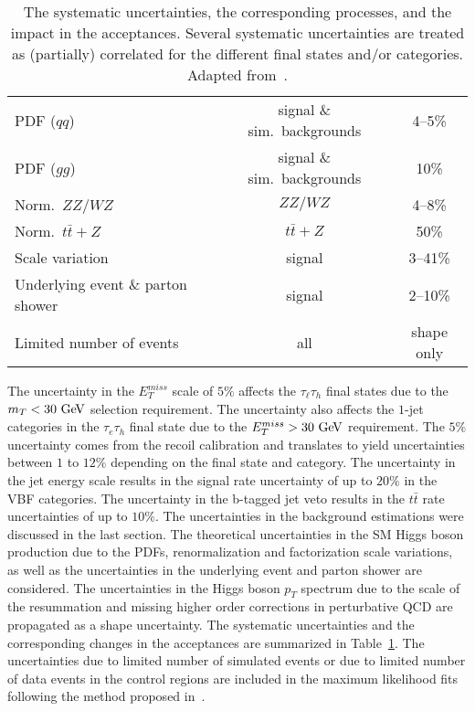 \begin{table}[!ht]
\begin{center}
{\begin{tabular}{lcc}
\hline
 PDF ($qq$)                          & signal \& sim.\ backgrounds  & 4--5\% \\
 PDF ($gg$)                          & signal \& sim.\ backgrounds  & 10\% \\
 Norm.\ $ZZ/WZ$            & $ZZ/WZ$ & 4--8\% \\
 Norm.\ $t\bar{t} + Z$            & $t\bar{t} + Z$ & 50\% \\
 Scale variation                         & signal                       & 3--41\% \\
 Underlying event \& parton shower      & signal                       & 2--10\% \\
\hline
 Limited number of events                & all                 & shape only \\
 \hline
\end{tabular}
}
\caption{The systematic uncertainties, the corresponding processes, and the impact in the acceptances. Several systematic uncertainties are treated as (partially) correlated for the different final states and/or categories. Adapted from~\cite{Chatrchyan:2014nva}.
}
\label{tab:uncertainties}
\end{center}
\end{table} 

The uncertainty in the  $E_{T}^{miss}$ scale of $5\%$ affects the $\tau_{\ell}\tau_h$ final states due to the $m_{T}<30~\mathrm{Ge\kern -0.1em V}$ selection requirement. The uncertainty also affects the $1$-jet categories in the $\tau_e\tau_h$ final state due to the $E_{T}^{miss}>30~\mathrm{Ge\kern -0.1em V}$ requirement.  The $5\%$ uncertainty comes from the recoil calibration and translates to yield uncertainties between $1$ to $12\%$ depending on the final state and category. The uncertainty in the jet energy scale results in the signal rate uncertainty of up to $20\%$ in the VBF categories. The uncertainty in the b-tagged jet veto results in the $t\bar{t}$ rate uncertainties of up to $10\%$. The uncertainties in the background estimations were discussed in the last section. The theoretical uncertainties in the SM Higgs boson production due to the PDFs, renormalization and factorization scale variations, as well as the uncertainties in the underlying event and parton shower are considered. The uncertainties in the Higgs boson $p_T$ spectrum due to the scale of the resummation and missing higher order corrections in perturbative QCD are propagated as a shape uncertainty. The systematic uncertainties and the corresponding changes in the acceptances are summarized in Table~\ref{tab:uncertainties}. The uncertainties due to limited number of simulated events or due to limited number of data events in the control regions are included in the maximum likelihood fits following the method proposed in~\cite{Barlow:1993dm}.   

